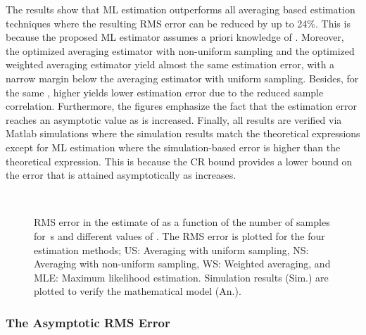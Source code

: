 \documentclass[11pt,draftclsnofoot,journal,onecolumn]{IEEEtran}
\begin{document}
The results show that ML estimation outperforms all averaging based estimation techniques where the resulting RMS error can be reduced by up to 24\%. This is because the proposed ML estimator assumes a priori knowledge of . Moreover, the optimized averaging estimator with non-uniform sampling and the optimized weighted averaging estimator yield almost the same estimation error, with a narrow margin below the averaging estimator with uniform sampling. Besides, for the same , higher  yields lower estimation error due to the reduced sample correlation. Furthermore, the figures emphasize the fact that the estimation error reaches an asymptotic value as  is increased. Finally, all results are verified via Matlab simulations where the simulation results match the theoretical expressions except for ML estimation where the simulation-based error is higher than the theoretical expression. This is because the CR bound provides a lower bound on the error that is attained asymptotically as  increases.
\begin{figure}
\centering
{}\\
\caption{RMS error in the estimate of  as a function of the number of samples  for \,s and different values of . The RMS error is plotted for the four estimation methods; US: Averaging with uniform sampling, NS: Averaging with non-uniform sampling, WS: Weighted averaging, and MLE: Maximum likelihood estimation. Simulation results (Sim.) are plotted to verify the mathematical model (An.).}
\label{fig:rms_n}
\end{figure}

\subsubsection{The Asymptotic RMS Error}
\end{document}
